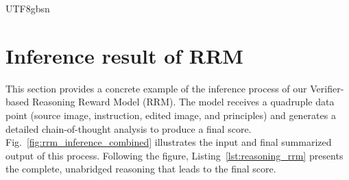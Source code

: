 \documentclass{llmxive}
\begin{document}
\begin{CJK*}{UTF8}{gbsn}


\section{Inference result of RRM}
\label{append:rrm}
This section provides a concrete example of the inference process of our Verifier-based Reasoning Reward Model (RRM). The model receives a quadruple data point (source image, instruction, edited image, and principles) and generates a detailed chain-of-thought analysis to produce a final score. 
Fig.~\ref{fig:rrm_inference_combined} illustrates the input and final summarized output of this process. Following the figure, Listing~\ref{lst:reasoning_rrm} presents the complete, unabridged reasoning that leads to the final score.


\end{CJK*}
\end{document}

